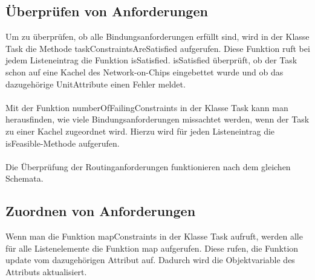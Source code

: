 \subsection{Überprüfen von Anforderungen}
Um zu überprüfen, ob alle Bindungsanforderungen erfüllt sind, wird in der Klasse Task die Methode taskConstraintsAreSatisfied aufgerufen. Diese Funktion ruft bei jedem Listeneintrag die Funktion isSatisfied. isSatisfied überprüft, ob der Task schon auf eine Kachel des Network-on-Chips eingebettet wurde und ob das dazugehörige UnitAttribute einen Fehler meldet.\\
\\
Mit der Funktion numberOfFailingConstraints in der Klasse Task kann man herausfinden, wie viele Bindungsanforderungen missachtet werden, wenn der Task zu einer Kachel zugeordnet wird. Hierzu wird für jeden Listeneintrag die isFeasible-Methode aufgerufen.\\
\\
Die Überprüfung der Routinganforderungen funktionieren nach dem gleichen Schemata.

\subsection{Zuordnen  von Anforderungen}
Wenn man die Funktion mapConstraints in der Klasse Task aufruft, werden alle für alle Listenelemente die Funktion map aufgerufen. Diese rufen, die Funktion update vom dazugehörigen Attribut auf. Dadurch wird die Objektvariable des Attributs aktualisiert.
